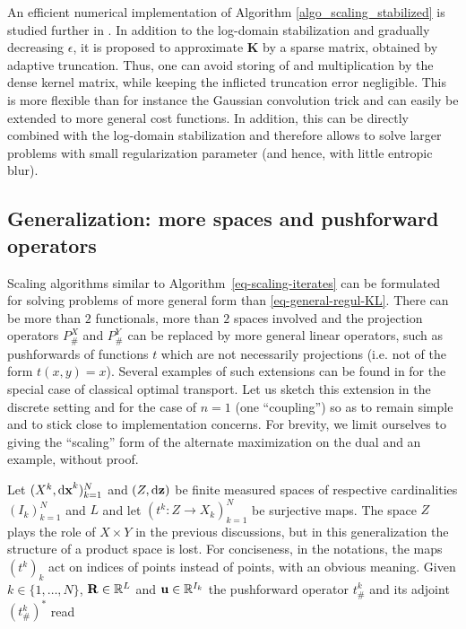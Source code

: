 An efficient numerical implementation of Algorithm \ref{algo_scaling_stabilized} is studied further in \cite{SchmitzerScaling2016}. In addition to the log-domain stabilization and gradually decreasing $\epsilon$,
it is proposed to approximate $\mathbf{K}$ by a sparse matrix, obtained by adaptive truncation.
Thus, one can avoid storing of and multiplication by the dense kernel matrix, while keeping the inflicted truncation error negligible. This is more flexible than for instance the Gaussian convolution trick and can easily be extended to more general cost functions. In addition, this can be directly combined with the log-domain stabilization and therefore allows to solve larger problems with small regularization parameter (and hence, with little entropic blur).



\subsection{Generalization: more spaces and pushforward operators}
Scaling algorithms similar to Algorithm~\eqref{eq-scaling-iterates} can be formulated for solving problems of more general form than \eqref{eq-general-regul-KL}. There can be more than $2$ functionals, more than $2$ spaces involved and the projection operators $P^X_\#$ and $P^Y_\#$ can be replaced by more general linear operators, such as pushforwards of functions $t$ which are not necessarily projections (i.e. not of the form $t(x,y)= x$). 
Several examples of such extensions can be found in \cite{2015-benamou-cisc} for the special case of classical optimal transport. Let us sketch this extension in the discrete setting and for the case of $n=1$ (one ``coupling'') so as to remain simple and to stick close to implementation concerns. For brevity, we limit ourselves to giving the ``scaling'' form of the alternate maximization on the dual and an example, without proof.

Let $(X^k,\mathbf{\mathrm{d} x}^k)_{k=1}^N$ and $(Z,\mathbf{\mathrm{d} z})$ be finite measured spaces of respective cardinalities $(I_k)_{k=1}^N$ and $L$ and let $(t^k:Z\to X_k)_{k=1}^N$ be surjective maps. The space $Z$ plays the role of $X\times Y$ in the previous discussions, but in this generalization the structure of a product space is lost. For conciseness, in the notations, the maps $(t^k)_k$ act on indices of points instead of points, with an obvious meaning. Given $k\in \{1,\dots,N\}$, $\mathbf{R}\in \mathbb{R}^L$ and $\mathbf{u}\in \mathbb{R}^{I_k}$ the pushforward operator $t^k_\#$ and its adjoint $(t^k_\#)^*$ read

